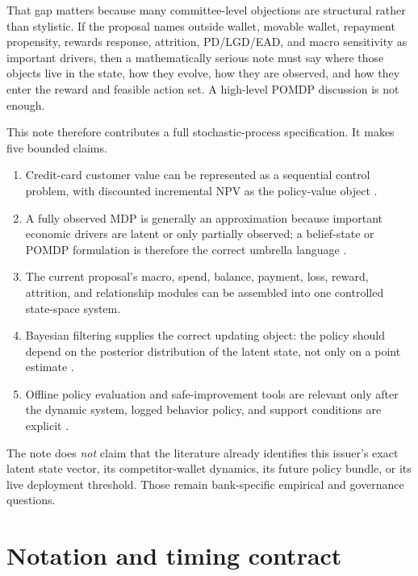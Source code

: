 \documentclass[11pt]{article}
\newcommand{\1}{\mathbf{1}}
\theoremstyle{definition}
\begin{document}
That gap matters because many committee-level objections are structural rather
than stylistic. If the proposal names outside wallet, movable wallet, repayment
propensity, rewards response, attrition, PD/LGD/EAD, and macro sensitivity as
important drivers, then a mathematically serious note must say where those
objects live in the state, how they evolve, how they are observed, and how they
enter the reward and feasible action set. A high-level POMDP discussion is not
enough.

This note therefore contributes a full stochastic-process specification. It
makes five bounded claims.
\begin{enumerate}[label=\arabic*.]
  \item Credit-card customer value can be represented as a sequential control
        problem, with discounted incremental NPV as the policy-value object
        \citep{trench2003bankone,puterman1994mdp,murphy2003dynamic}.
  \item A fully observed MDP is generally an approximation because important
        economic drivers are latent or only partially observed; a belief-state
        or POMDP formulation is therefore the correct umbrella language
        \citep{smallwood1973pomdp,kaelbling1998pomdp}.
  \item The current proposal's macro, spend, balance, payment, loss, reward,
        attrition, and relationship modules can be assembled into one controlled
        state-space system.
  \item Bayesian filtering supplies the correct updating object: the policy
        should depend on the posterior distribution of the latent state, not
        only on a point estimate
        \citep{durbinkoopman2012ssm,westharrison1997bfdm,doucet2001smc}.
  \item Offline policy evaluation and safe-improvement tools are relevant only
        after the dynamic system, logged behavior policy, and support conditions
        are explicit
        \citep{jiangli2016dr,huwager2021pomdpope,laroche2019spibb,
        khraishiokhrati2022offlinecredit}.
\end{enumerate}

The note does \emph{not} claim that the literature already identifies this
issuer's exact latent state vector, its competitor-wallet dynamics, its future
policy bundle, or its live deployment threshold. Those remain bank-specific
empirical and governance questions.

\section{Notation and timing contract}
\end{document}
